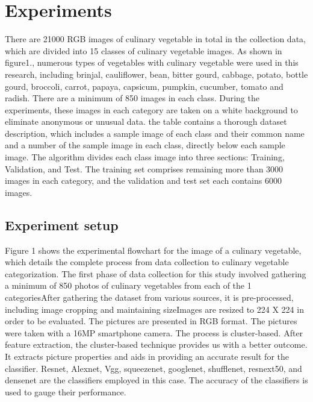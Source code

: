 \documentclass[a4paper,fleqn]{cas-sc}
\begin{document}
\section{Experiments}
 There are 21000 RGB images of culinary vegetable in total in the collection data, which are divided into 15 classes of culinary vegetable images. As shown in figure1., numerous types of vegetables with culinary vegetable were used in this research, including   brinjal, cauliflower, bean, bitter gourd, cabbage, potato, bottle gourd, broccoli, carrot, papaya, capsicum, pumpkin, cucumber, tomato and radish. There are a minimum of 850 images in each class. During the experiments, these images in each category are taken on a white background to eliminate anonymous or unusual data. the table contains a thorough dataset description, which includes a sample image of each class and their common name and a number of the sample image in each class, directly below each sample image. The algorithm divides each class image into three sections: Training, Validation, and Test. The training set comprises remaining more than 3000 images in each category, and the validation and test set each contains 6000 images.

\subsection{Experiment setup}
Figure 1 shows the experimental flowchart for the image of a culinary vegetable, which details the complete process from data collection to culinary vegetable categorization. The first phase of data collection for this study involved gathering a minimum of 850 photos of culinary vegetables from each of the 1 categoriesAfter gathering the dataset from various sources, it is pre-processed, including image cropping and maintaining sizeImages are resized to 224 X 224 in order to be evaluated. The pictures are presented in RGB format. The pictures were taken with a 16MP smartphone camera. The process is cluster-based. After feature extraction, the cluster-based technique provides us with a better outcome. It extracts picture properties and aids in providing an accurate result for the classifier. Resnet, Alexnet, Vgg, squeezenet, googlenet, shufflenet, resnext50, and densenet are the classifiers employed in this case. The accuracy of the classifiers is used to gauge their performance.  
\end{document}
